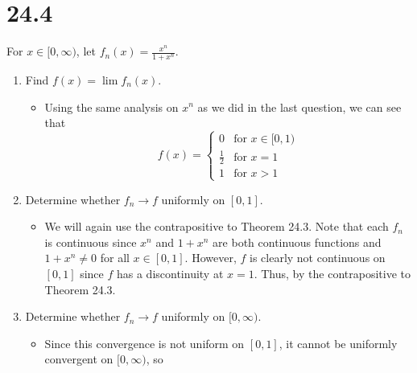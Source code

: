 \documentclass[10pt,a4paper]{article}
\theoremstyle{definition}
\begin{document}
\section*{24.4}
For $x \in [0, \infty)$, let $\displaystyle f_n(x) = \frac{x^n}{1 + x^n}$.
\begin{enumerate}[label = (\alph*)]
\item Find $f(x) = \lim f_n(x)$.
	\begin{itemize}
	\item Using the same analysis on $x^n$ as we did in the last question, we can see that 
	\[f(x) = \begin{cases}
	0 &\text{for $x \in [0, 1)$}\\
	\frac{1}{2} &\text{for $x = 1$}\\
	1 &\text{for $x > 1$}
	\end{cases}\]
	\end{itemize}
\item Determine whether $f_n \to f$ uniformly on $[0,1]$.
	\begin{itemize}
	\item We will again use the contrapositive to Theorem 24.3. Note that each $f_n$ is continuous since $x^n$ and $1 + x^n$ are both continuous functions and $1 + x^n \neq 0$ for all $x \in [0, 1]$. However, $f$ is clearly not continuous on $[0,1]$ since $f$ has a discontinuity at $x = 1$. Thus,  by the contrapositive to Theorem 24.3.
	\end{itemize}
\item Determine whether $f_n \to f$ uniformly on $[0, \infty)$.
	\begin{itemize}
	\item Since this convergence is not uniform on $[0,1]$, it cannot be uniformly convergent on $[0,\infty)$, so \\ 
	\end{itemize}
\end{enumerate}
\end{document}
